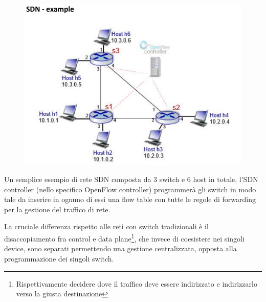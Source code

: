 \begin{figure}[htbp]
   \centering
   \includegraphics{images/questions/Schermata del 2023-11-02 11-52-53.png}
   \label{fig:dom2.8}
\end{figure}

Un semplice esempio di  rete SDN composta da 3 switch e 6 host in totale, l'SDN controller (nello specifico OpenFlow controller) programmerà gli switch in modo tale da inserire in ognuno di essi una flow table con tutte le regole di forwarding per la gestione del traffico di rete.

La cruciale differenza rispetto alle reti con switch tradizionali è il disaccopiamento fra control e data plane\footnote{Rispettivamente decidere dove il traffico deve essere indirizzato e indirizzarlo verso la giusta destinazione}, che invece di coesistere nei singoli device, sono separati permettendo una gestione centralizzata, opposta alla programmazione dei singoli switch. 

